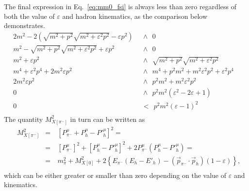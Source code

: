 The final expression in Eq.~\eqref{eq:mm0_fsi} is always less than zero regardless of both the value of $\varepsilon$ and hadron kinematics, as the comparison below demonstrates.\vspace{-0.5em}
\begin{equation}
\begin{aligned}
2m^{2} - 2(\sqrt{m^{2}+p^{2}}\sqrt{m^{2}+\varepsilon^{2}p^{2}}-\varepsilon p^{2})& ~~\wedge~~ 0&\\
m^{2} - \sqrt{m^{2}+p^{2}}\sqrt{m^{2}+\varepsilon^{2}p^{2}} +\varepsilon p^{2} &~~\wedge~~ 0&\\
m^{2}+\varepsilon p^{2} &~~\wedge~~ \sqrt{m^{2}+p^{2}}\sqrt{m^{2}+\varepsilon^{2}p^{2}}&\\
m^{4}+\varepsilon^{2}p^{4}+2m^{2}\varepsilon p^{2} &~~\wedge~~ m^{4} + p^{2}m^{2} + m^{2}\varepsilon^{2}p^{2}+\varepsilon^{2}p^{4}&\\
2m^{2}\varepsilon p^{2} &~~\wedge~~ p^{2}m^{2}+  m^{2}\varepsilon^{2}p^{2}&\\
0 &~~\wedge~~ p^{2}m^{2}(\varepsilon^{2}-2\varepsilon+1)&\\
0&~~<~~ p^{2}m^{2}(\varepsilon-1)^{2}&\\[-7pt]
\end{aligned}\label{eq:comp}
\end{equation}
\vspace{-0.3em}
The quantity $M_{X[\pi^{-}]}^{2}$ in turn can be written as\vspace{-0.5em}
\begin{equation}
\begin{aligned}
&M_{X[\pi^{-}]}^{2}&=&~[P^{\mu}_{\pi^{-}}+ P^{\mu}_{h} -P'^{\mu}_{h}]^{2} =\\
&&=&~[P^{\mu}_{\pi^{-}}]^{2} +[P^{\mu}_{h} -P'^{\mu}_{h}]^{2}+2P^{\mu}_{\pi^{-}}(P^{\mu}_{h} -P'^{\mu}_{h})= \\
&&=&~m_{\pi}^{2} + M_{X[0]}^{2} +2\left \{E_{\pi^{-}}(E_{h}-E'_{h}) - (\overrightarrow{p}_{\pi^{-}}\cdot \overrightarrow{p}_{h})(1-\varepsilon)\right \},\\[-7pt]
\end{aligned}\label{eq:rrr}
\end{equation}
which can be either greater or smaller than zero depending on the value of $\varepsilon$ and kinematics.

